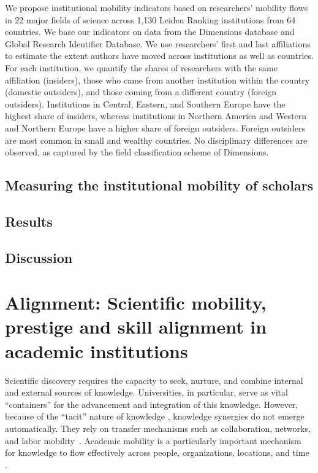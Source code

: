 \documentclass[draft,final]{vutinfth} %
\begin{document}
We propose institutional mobility indicators based on researchers’ mobility flows in 22 major fields of science across 1,130 Leiden Ranking institutions from 64 countries. We base our indicators on data from the Dimensions database and Global Research Identifier Database. We use researchers’ first and last affiliations to estimate the extent authors have moved across institutions as well as countries. For each institution, we quantify the shares of researchers with the same affiliation (insiders), those who came from another institution within the country (domestic outsiders), and those coming from a different country (foreign outsiders). Institutions in Central, Eastern, and Southern Europe have the highest share of insiders, whereas institutions in Northern America and Western and Northern Europe have a higher share of foreign outsiders. Foreign outsiders are most common in small and wealthy countries. No disciplinary differences are observed, as captured by the field classification scheme of Dimensions.


\section{Measuring the institutional mobility of scholars}

\section{Results}

\section{Discussion}


\chapter{Alignment: Scientific mobility, prestige and skill alignment in academic institutions}
Scientific discovery requires the capacity to seek, nurture, and combine internal and external sources of knowledge. Universities, in particular, serve as vital ``containers'' for the advancement and integration of this knowledge. However, because of the ``tacit'' nature of knowledge \cite{gertler2003tacit}, knowledge synergies do not emerge automatically. They rely on transfer mechanisms such as collaboration, networks, and labor mobility~\cite{cohen1990absorptive, zucker1994intellectual, gertler2003tacit, winter1982evolutionary}. Academic mobility is a particularly important mechanism for knowledge to flow effectively across people, organizations, locations, and time \cite{cohen1990absorptive, stephan2001exceptional, ganguli2015immigration}. 
\end{document}
